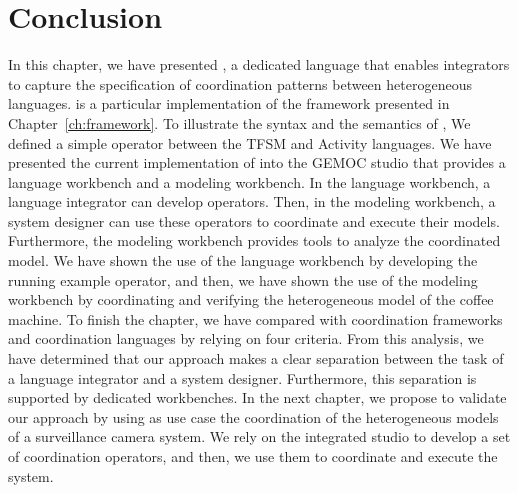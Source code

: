 \section{Conclusion}
In this chapter, we have presented \bcool, a dedicated language that enables integrators to capture the specification of coordination patterns between heterogeneous languages. \bcool is a particular implementation of the framework presented in Chapter~\ref{ch:framework}. To illustrate the syntax and the semantics of \bcool, We defined a simple operator between the TFSM and Activity languages. We have presented the current implementation of \bcool into the GEMOC studio that provides a language workbench and a modeling workbench. In the language workbench, a language integrator can develop \bcool operators. Then, in the modeling workbench, a system designer can use these operators to coordinate and execute their models. Furthermore, the modeling workbench provides tools to analyze the coordinated model. We have shown the use of the language workbench by developing the running example operator, and then, we have shown the use of the modeling workbench by coordinating and verifying the heterogeneous model of the coffee machine. To finish the chapter, we have compared \bcool with coordination frameworks and coordination languages by relying on four criteria. From this analysis, we have determined that our approach makes a clear separation between the task of a language integrator and a system designer. Furthermore, this separation is supported by dedicated workbenches. In the next chapter, we propose to validate our approach by using as use case the coordination of the heterogeneous models of a surveillance camera system. We rely on the integrated studio to develop a set of coordination operators, and then, we use them to coordinate and execute the system. 


